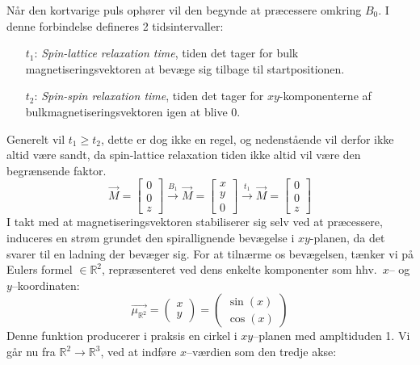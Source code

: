     Når den kortvarige puls ophører vil den begynde at præcessere omkring $B_0$. I denne forbindelse defineres 2 tidsintervaller:
    \begin{itemize}
        \item[$t_1$:] \textit{Spin-lattice relaxation time}, tiden det tager for bulk magnetiseringsvektoren at bevæge sig tilbage til startpositionen.
        \item[$t_2$:] \textit{Spin-spin relaxation time}, tiden det tager for $xy$-komponenterne af bulkmagnetiseringsvektoren igen at blive 0. 
    \end{itemize}
    Generelt vil $t_1 \geq t_2$, dette er dog ikke en regel, og nedenstående vil derfor ikke altid være sandt, da spin-lattice relaxation tiden ikke altid vil være den begrænsende faktor.
    \[
        \vec{M}=
        \begin{bmatrix}
            0 \\
            0 \\
            z
        \end{bmatrix}
        \stackrel{B_1}{\longrightarrow}
        \vec{M}=
        \begin{bmatrix}
            x \\
            y \\
            0
        \end{bmatrix}
        \stackrel{t_1}{\longrightarrow}
        \vec{M}=
        \begin{bmatrix}
            0 \\
            0 \\
            z
        \end{bmatrix}
    \]
    I takt med at magnetiseringsvektoren stabiliserer sig selv ved at præcessere, induceres en strøm grundet den spirallignende bevægelse i $xy$-planen, da det svarer til en ladning der bevæger sig. For at tilnærme os bevægelsen, tænker vi på Eulers formel $\in \mathbb{R}^2$, repræsenteret ved dens enkelte komponenter som hhv.\ $x$-- og $y$--koordinaten:
    \[
        \overrightarrow{\mu_{\mathbb{R}^2}}=
        \begin{pmatrix}
            x \\
            y
        \end{pmatrix}=
        \begin{pmatrix}
            \sin(x) \\
            \cos(x)
        \end{pmatrix}
    \]
    Denne funktion producerer i praksis en cirkel i $xy$--planen med ampltiduden 1. Vi går nu fra $\mathbb{R}^2 \rightarrow \mathbb{R}^3$, ved at indføre $x$--værdien som den tredje akse:

